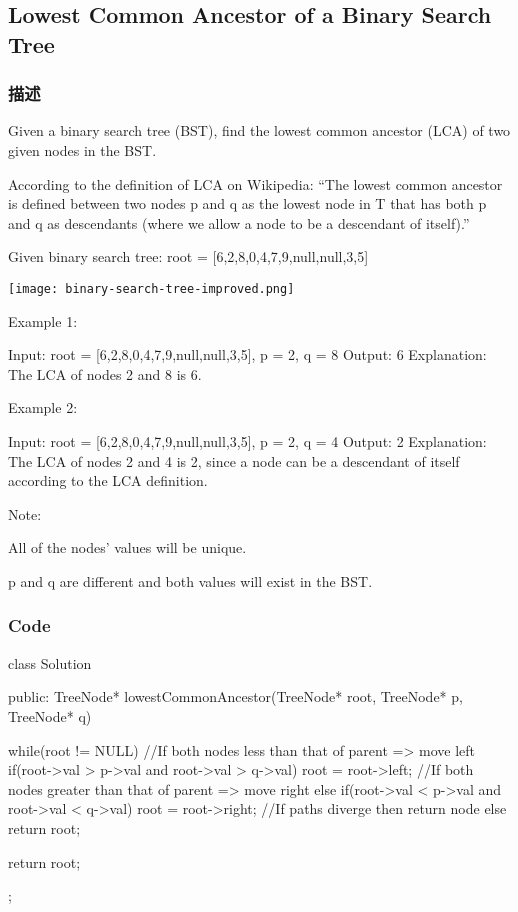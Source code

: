 \subsection{Lowest Common Ancestor of a Binary Search Tree}
\label{sec:lowest-common-ancestor-of-a-binary-search-tree}

\subsubsection{描述}
Given a binary search tree (BST), find the lowest common ancestor (LCA) of two given nodes in the BST.

According to the definition of LCA on Wikipedia: “The lowest common ancestor is defined between two nodes p and q as the lowest node in T that has both p and q as descendants (where we allow a node to be a descendant of itself).”

Given binary search tree:  root = [6,2,8,0,4,7,9,null,null,3,5]

\begin{center}
\texttt{[image: binary-search-tree-improved.png]}\\
\label{fig:binary-search-tree-improved}
\end{center}

Example 1:
\begin{Code}
Input: root = [6,2,8,0,4,7,9,null,null,3,5], p = 2, q = 8
Output: 6
Explanation: The LCA of nodes 2 and 8 is 6.
\end{Code}

Example 2:
\begin{Code}
Input: root = [6,2,8,0,4,7,9,null,null,3,5], p = 2, q = 4
Output: 2
Explanation: The LCA of nodes 2 and 4 is 2, since a node can be a descendant of itself according to the LCA definition.
\end{Code}

Note:
\begindot
\item All of the nodes' values will be unique.
\item p and q are different and both values will exist in the BST.
\myenddot

\subsubsection{Code}
\begin{Code}
class Solution {
public:
    TreeNode* lowestCommonAncestor(TreeNode* root, TreeNode* p, TreeNode* q) {
        while(root != NULL)
        {
            //If both nodes less than that of parent => move left
            if(root->val > p->val and root->val > q->val)
                root = root->left;
            //If both nodes greater than that of parent => move right
            else if(root->val < p->val and root->val < q->val)
                root = root->right;
            //If paths diverge then return node
            else
                return root;
        }

        return root;
    }
};
\end{Code}

